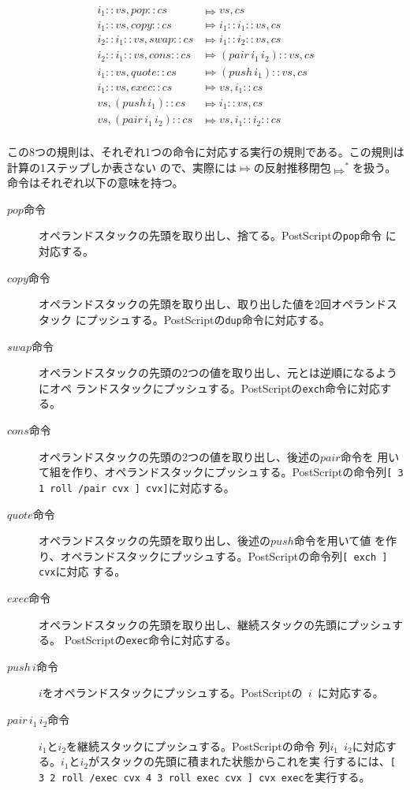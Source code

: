 \documentclass[a4paper, 10pt, twocolumn, titlepage]{ujarticle}
\renewcommand{\{}{\symbol{"7B}}
\renewcommand{\}}{\symbol{"7D}}
\begin{document}
\begin{align*}
 i_1 :: vs , \mathit{pop} :: cs           & \Mapsto vs , cs \\
 i_1 :: vs , \mathit{copy} :: cs          & \Mapsto i_1 :: i_1 :: vs , cs \\
 i_2 :: i_1 :: vs , \mathit{swap} :: cs   & \Mapsto i_1 :: i_2 :: vs, cs \\
 i_2 :: i_1 :: vs , \mathit{cons} :: cs   & \Mapsto (\mathit{pair} \, i_1 \, i_2) :: vs , cs \\
 i_1 :: vs , \mathit{quote} :: cs         & \Mapsto (\mathit{push} \, i_1) :: vs , cs \\
 i_1 :: vs , \mathit{exec} :: cs          & \Mapsto vs , i_1 :: cs \\
 vs , (\mathit{push} \, i_1) :: cs        & \Mapsto i_1 :: vs , cs \\
 vs , (\mathit{pair} \, i_1 \, i_2) :: cs & \Mapsto vs , i_1 :: i_2 :: cs \\
\end{align*}

この8つの規則は、それぞれ1つの命令に対応する実行の規則である。この規則は計算の1ステップしか表さない
ので、実際には$\Mapsto$の反射推移閉包$\Mapsto^*$を扱う。命令はそれぞれ以下の意味を持つ。

\begin{description}
 \item[$\mathit{pop}$命令] オペランドスタックの先頭を取り出し、捨てる。PostScriptの\texttt{pop}命令
	    に対応する。
 \item[$\mathit{copy}$命令] オペランドスタックの先頭を取り出し、取り出した値を2回オペランドスタック
	    にプッシュする。PostScriptの\texttt{dup}命令に対応する。
 \item[$\mathit{swap}$命令] オペランドスタックの先頭の2つの値を取り出し、元とは逆順になるようにオペ
	    ランドスタックにプッシュする。PostScriptの\texttt{exch}命令に対応する。
 \item[$\mathit{cons}$命令] オペランドスタックの先頭の2つの値を取り出し、後述の$\mathit{pair}$命令を
	    用いて組を作り、オペランドスタックにプッシュする。PostScriptの命令列\texttt{[ 3 1 roll
	    /pair cvx ] cvx]}に対応する。
 \item[$\mathit{quote}$命令] オペランドスタックの先頭を取り出し、後述の$\mathit{push}$命令を用いて値
	    を作り、オペランドスタックにプッシュする。PostScriptの命令列\texttt{[ exch ] cvx}に対応
	    する。
 \item[$\mathit{exec}$命令] オペランドスタックの先頭を取り出し、継続スタックの先頭にプッシュする。
	    PostScriptの\texttt{exec}命令に対応する。
 \item[$\mathit{push} \, i$命令] $i$をオペランドスタックにプッシュする。PostScriptの\texttt{\{ $i$
	    \}}に対応する。
 \item[$\mathit{pair} \, i_1 \, i_2$命令] $i_1$と$i_2$を継続スタックにプッシュする。PostScriptの命令
	    列\texttt{$i_1$ $i_2$}に対応する。$i_1$と$i_2$がスタックの先頭に積まれた状態からこれを実
	    行するには、\texttt{[ 3 2 roll /exec cvx 4 3 roll exec cvx ] cvx exec}を実行する。
\end{description}
\end{document}
